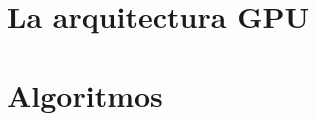 \documentclass[a4paper,10pt]{report}
\begin{document}
\chapter{La arquitectura GPU}











\chapter{Algoritmos}

\end{document}

